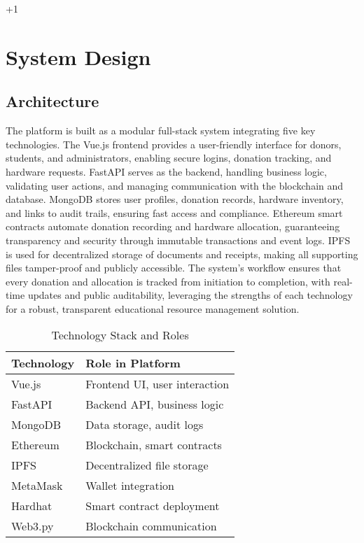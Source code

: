 +1\documentclass[conference]{IEEEtran}
\begin{document}
\section{System Design}
\subsection{Architecture}
The platform is built as a modular full-stack system integrating five key technologies. The Vue.js frontend provides a user-friendly interface for donors, students, and administrators, enabling secure logins, donation tracking, and hardware requests. FastAPI serves as the backend, handling business logic, validating user actions, and managing communication with the blockchain and database. MongoDB stores user profiles, donation records, hardware inventory, and links to audit trails, ensuring fast access and compliance. Ethereum smart contracts automate donation recording and hardware allocation, guaranteeing transparency and security through immutable transactions and event logs. IPFS is used for decentralized storage of documents and receipts, making all supporting files tamper-proof and publicly accessible. The system’s workflow ensures that every donation and allocation is tracked from initiation to completion, with real-time updates and public auditability, leveraging the strengths of each technology for a robust, transparent educational resource management solution.

\begin{table}[ht] %
\caption{Technology Stack and Roles}
\centering
\begin{tabular}{|l|l|} %
\hline
\textbf{Technology} & \textbf{Role in Platform} \\
\hline
Vue.js & Frontend UI, user interaction \\
FastAPI & Backend API, business logic \\
MongoDB & Data storage, audit logs \\
Ethereum & Blockchain, smart contracts \\
IPFS & Decentralized file storage \\
MetaMask & Wallet integration \\
Hardhat & Smart contract deployment \\
Web3.py & Blockchain communication \\
\hline
\end{tabular}
\label{tab:techstack}
\end{table}
\end{document}
